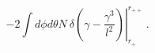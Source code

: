 \begin{equation}
 \left. - 2 \int d\phi d\theta  N \  \delta \left( \gamma - \frac{\gamma^3}{l^2} \right)
 \right|^{r_{++}}_{r_+}  \ .
\label{var3}
\end{equation}

